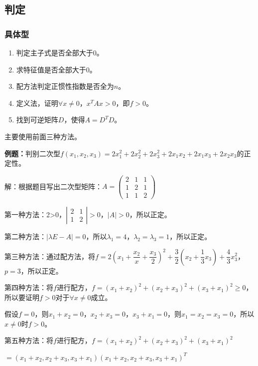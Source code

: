 \documentclass[UTF8, 12pt]{ctexart}
\begin{document}
\subsection{判定}

\subsubsection{具体型}

\begin{enumerate}
\item 判定主子式是否全部大于0。
\item 求特征值是否全部大于0。
\item 配方法判定正惯性指数是否全为$n$。
\item 定义法，证明$\forall x\neq0$，$x^TAx>0$，即$f>0$。
\item 找到可逆矩阵$D$，使得$A=D^TD$。
\end{enumerate}

主要使用前面三种方法。

\textbf{例题：}判别二次型$f(x_1,x_2,x_3)=2x_1^2+2x_2^2+2x_3^2+2x_1x_2+2x_1x_3+2x_2x_3$的正定性。

解：根据题目写出二次型矩阵：$A=\left(\begin{array}{ccc}
2 & 1 & 1 \\
1 & 2 & 1 \\
1 & 1 & 2
\end{array}\right)$

第一种方法：2>0，$\left|\begin{array}{cc}
2 & 1 \\
1 & 2
\end{array}\right|>0$，$\vert A\vert>0$，所以正定。

第二种方法：$\vert\lambda E-A\vert=0$，所以$\lambda_1=4$，$\lambda_2=\lambda_3=1$，所以正定。

第三种方法：通过配方法，将$f=2\left(x_1+\dfrac{x_2}{x}+\dfrac{x_3}{2}\right)^2+\dfrac{3}{2}\left(x_2+\dfrac{1}{3}x_3\right)+\dfrac{4}{3}x_3^2$，$p=3$，所以正定。

第四种方法：将$f$进行配方，$f=(x_1+x_2)^2+(x_2+x_3)^2+(x_3+x_1)^2\geqslant0$，所以要证明$f>0$对于$\forall x\neq0$成立。

假设$f=0$，则$x_1+x_2=0$，$x_2+x_3=0$，$x_3+x_1=0$，则$x_1=x_2=x_3=0$，所以$x\neq0$时$f>0$。

第五种方法：将$f$进行配方，$f=(x_1+x_2)^2+(x_2+x_3)^2+(x_3+x_1)^2$

$=(x_1+x_2,x_2+x_3,x_3+x_1)(x_1+x_2,x_2+x_3,x_3+x_1)^T$
\end{document}
